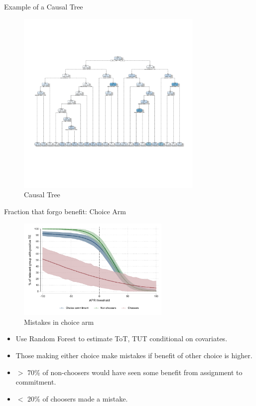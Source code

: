 \documentclass[8pt]{beamer}
\begin{document}
\begin{frame}{Example of a Causal Tree}

    \begin{figure}
        \caption{Causal Tree}
        \centering
\includegraphics[width=0.8\textwidth]{Figuras/ct_eff.pdf}
        \end{figure}

\end{frame}





\begin{frame}{Fraction that forgo benefit:  Choice Arm}


    
    
        \begin{figure}
        \caption{Mistakes in choice arm}
        \centering
        \includegraphics[width=0.65\textwidth]{Figuras/line_cw_apr_tot_tut.pdf}
        \end{figure}

\begin{itemize}
    \item   Use Random Forest to estimate ToT, TUT conditional on covariates.
    \item   Those making either choice make mistakes if benefit of other choice is higher.
    \item $>$ 70\% of non-choosers would have seen some benefit from assignment to commitment.
    \item  $<$ 20\% of choosers made a mistake.
\end{itemize}        


\end{frame}
\end{document}
